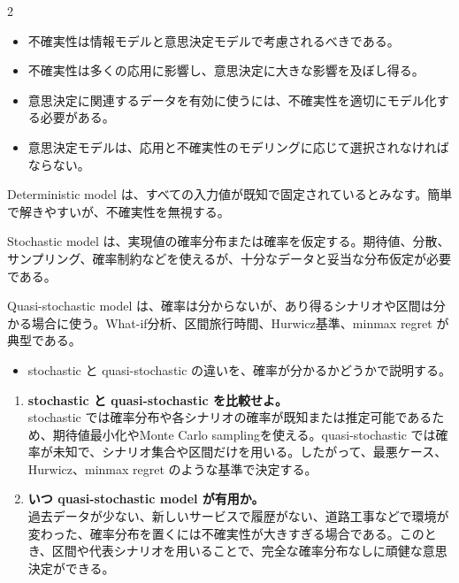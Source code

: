 \clearpage
{}
\begin{multicols}{2}\footnotesize\raggedcolumns
{}
\begin{itemize}
\item 不確実性は情報モデルと意思決定モデルで考慮されるべきである。
\item 不確実性は多くの応用に影響し、意思決定に大きな影響を及ぼし得る。
\item 意思決定に関連するデータを有効に使うには、不確実性を適切にモデル化する必要がある。
\item 意思決定モデルは、応用と不確実性のモデリングに応じて選択されなければならない。
\end{itemize}
Deterministic model は、すべての入力値が既知で固定されているとみなす。簡単で解きやすいが、不確実性を無視する。\par

Stochastic model は、実現値の確率分布または確率を仮定する。期待値、分散、サンプリング、確率制約などを使えるが、十分なデータと妥当な分布仮定が必要である。\par

Quasi-stochastic model は、確率は分からないが、あり得るシナリオや区間は分かる場合に使う。What-if分析、区間旅行時間、Hurwicz基準、minmax regret が典型である。\par
{}
\begin{itemize}
\item stochastic と quasi-stochastic の違いを、確率が分かるかどうかで説明する。
\end{itemize}
\begin{enumerate}
\item \textbf{stochastic と quasi-stochastic を比較せよ。}\\stochastic では確率分布や各シナリオの確率が既知または推定可能であるため、期待値最小化やMonte Carlo samplingを使える。quasi-stochastic では確率が未知で、シナリオ集合や区間だけを用いる。したがって、最悪ケース、Hurwicz、minmax regret のような基準で決定する。
\item \textbf{いつ quasi-stochastic model が有用か。}\\過去データが少ない、新しいサービスで履歴がない、道路工事などで環境が変わった、確率分布を置くには不確実性が大きすぎる場合である。このとき、区間や代表シナリオを用いることで、完全な確率分布なしに頑健な意思決定ができる。
\end{enumerate}
\end{multicols}

